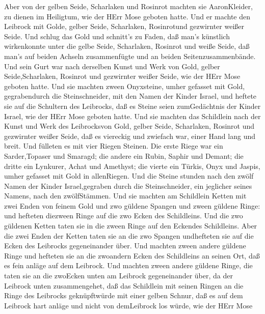  Aber von der gelben Seide, Scharlaken und Rosinrot machten
sie AaronKleider, zu dienen im Heiligtum, wie der HErr Mose geboten
hatte.  Und er machte den Leibrock mit Golde, gelber Seide,
Scharlaken, Rosinrotund gezwirnter weißer Seide.  Und schlug
das Gold und schnitt's zu Faden, daß man's künstlich wirkenkonnte unter
die gelbe Seide, Scharlaken, Rosinrot und weiße Seide,  daß
man's auf beiden Achseln zusammenfügte und an beiden
Seitenzusammenbände.  Und sein Gurt war nach derselben Kunst
und Werk von Gold, gelber Seide,Scharlaken, Rosinrot und gezwirnter
weißer Seide, wie der HErr Mose geboten hatte.  Und sie
machten zween Onyxsteine, umher gefasset mit Gold, gegrabendurch die
Steinschneider, mit den Namen der Kinder Israel,  und
heftete sie auf die Schultern des Leibrocks, daß es Steine seien
zumGedächtnis der Kinder Israel, wie der HErr Mose geboten hatte.
 Und sie machten das Schildlein nach der Kunst und Werk des
Leibrocksvon Gold, gelber Seide, Scharlaken, Rosinrot und gezwirnter
weißer Seide,  daß es viereckig und zwiefach war, einer Hand
lang und breit.  Und fülleten es mit vier Riegen Steinen.
Die erste Riege war ein Sarder,Topaser und Smaragd;  die
andere ein Rubin, Saphir und Demant;  die dritte ein
Lynkurer, Achat und Amethyst;  die vierte ein Türkis, Onyx
und Jaspis, umher gefasset mit Gold in allenRiegen.  Und
die Steine stunden nach den zwölf Namen der Kinder Israel,gegraben durch
die Steinschneider, ein jeglicher seines Namens, nach den zwölfStämmen.
 Und sie machten am Schildlein Ketten mit zwei Enden von
feinem Gold  und zwo güldene Spangen und zween güldene
Ringe: und hefteten diezween Ringe auf die zwo Ecken des Schildleins.
 Und die zwo güldenen Ketten taten sie in die zween Ringe
auf den Eckendes Schildleins.  Aber die zwei Enden der
Ketten taten sie an die zwo Spangen undhefteten sie auf die Ecken des
Leibrocks gegeneinander über.  Und machten zween andere
güldene Ringe und hefteten sie an die zwoandern Ecken des Schildleins an
seinen Ort, daß es fein anläge auf dem Leibrock.  Und
machten zween andere güldene Ringe, die taten sie an die zwoEcken unten
am Leibrock gegeneinander über, da der Leibrock unten zusammengehet,
 daß das Schildlein mit seinen Ringen an die Ringe des
Leibrocks geknüpftwürde mit einer gelben Schnur, daß es auf dem Leibrock
hart anläge und nicht von demLeibrock los würde, wie der HErr Mose
